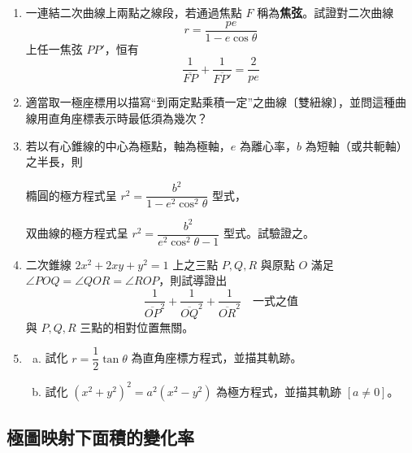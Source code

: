 \begin{enumerate}[1.]
  \item 一連結二次曲線上兩點之線段，若通過焦點 $F$ 稱為\textbf{焦弦}。試證對二次曲線
  \[
    r = \frac{pe}{1 - e\cos\theta}
  \]
  上任一焦弦 $PP'$，恒有
  \[
    \frac{1}{\overline{FP}} + \frac{1}{\overline{FP'}} = \frac{2}{pe}
  \]

  \item 適當取一極座標用以描寫“到兩定點乘積一定”之曲線〔雙紐線〕，並問這種曲線用直角座標表示時最低須為幾次？

  \item 若以有心錐線的中心為極點，軸為極軸，$e$ 為離心率，$b$ 為短軸（或共軛軸）之半長，則

  橢圓的極方程式呈 $r^2 = \dfrac{b^2}{1 - e^2\cos^2\theta}$ 型式，

  双曲線的極方程式呈 $r^2 = \dfrac{b^2}{e^2\cos^2\theta - 1}$ 型式。試驗證之。

  \item[*9.] 二次錐線 $2x^2 + 2xy + y^2 = 1$ 上之三點 $P, Q, R$ 與原點 $O$ 滿足 $\angle POQ = \angle QOR = \angle ROP$，則試導證出
  \[
    \frac{1}{\overline{OP}^2} + \frac{1}{\overline{OQ}^2} + \frac{1}{\overline{OR}^2} \quad \text{一式之值}
  \]
  與 $P, Q, R$ 三點的相對位置無關。

  \item[10.]
  \begin{enumerate}[(a)]
    \item 試化 $r = \dfrac{1}{2}\tan\theta$ 為直角座標方程式，並描其軌跡。
    \item 試化 $(x^2 + y^2)^2 = a^2(x^2 - y^2)$ 為極方程式，並描其軌跡 $[a \neq 0]$。
  \end{enumerate}
\end{enumerate}

\subsection{極圖映射下面積的變化率}
\label{sec:b5-1-6}

